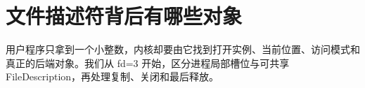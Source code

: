 \chapter{文件描述符背后有哪些对象}

用户程序只拿到一个小整数，内核却要由它找到打开实例、当前位置、访问模式和
真正的后端对象。我们从 fd=3 开始，区分进程局部槽位与可共享
FileDescription，再处理复制、关闭和最后释放。




